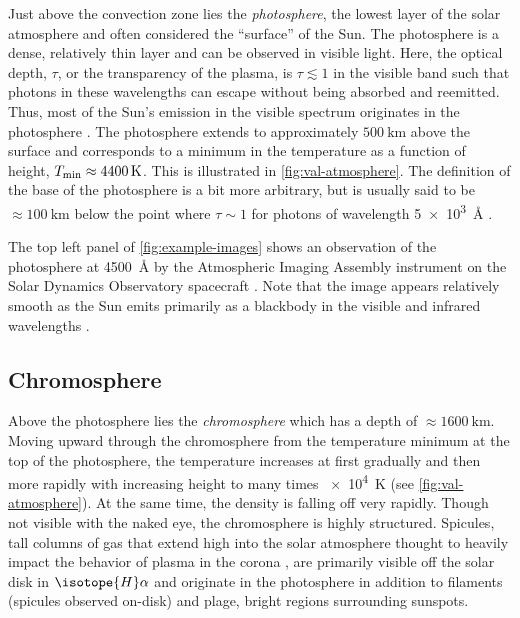 Just above the convection zone lies the \textit{photosphere}, the lowest layer of the solar atmosphere and often considered the ``surface'' of the Sun. The photosphere is a dense, relatively thin layer and can be observed in visible light. Here, the optical depth, $\tau$, or the transparency of the plasma, is $\tau\lesssim1$ in the visible band such that photons in these wavelengths can escape without being absorbed and reemitted. Thus, most of the Sun's emission in the visible spectrum originates in the photosphere \citep{priest_magnetohydrodynamics_2014}. The photosphere extends to approximately $\SI{500}{\km}$ above the surface and corresponds to a minimum in the temperature as a function of height, $T_\textup{min}\approx\SI{4400}{\kelvin}$. This is illustrated in \autoref{fig:val-atmosphere}. The definition of the base of the photosphere is a bit more arbitrary, but is usually said to be $\approx\SI{100}{\km}$ below the point where $\tau\sim1$ for photons of wavelength \SI{5e3}{\angstrom} \citep{carroll_introduction_2007}. 

The top left panel of \autoref{fig:example-images} shows an observation of the photosphere at \SI{4500}{\angstrom} by the Atmospheric Imaging Assembly instrument \citep[AIA][]{lemen_atmospheric_2012} on the Solar Dynamics Observatory spacecraft \citep[SDO][]{pesnell_solar_2012}. Note that the image appears relatively smooth as the Sun emits primarily as a blackbody in the visible and infrared wavelengths \citep{carroll_introduction_2007}.

\subsection{Chromosphere}\label{sec:chromosphere}

Above the photosphere lies the \textit{chromosphere} which has a depth of $\approx\SI{1600}{\km}$. Moving upward through the chromosphere from the temperature minimum at the top of the photosphere, the temperature increases at first gradually and then more rapidly with increasing height to many times \SI{e4}{\kelvin} (see \autoref{fig:val-atmosphere}). At the same time, the density is falling off very rapidly. Though not visible with the naked eye, the chromosphere is highly structured. Spicules, tall columns of gas that extend high into the solar atmosphere thought to heavily impact the behavior of plasma in the corona \citep{de_pontieu_origins_2011}, are primarily visible off the solar disk in $\isotope{H}\alpha$ and originate in the photosphere in addition to filaments (spicules observed on-disk) and plage, bright regions surrounding sunspots.

